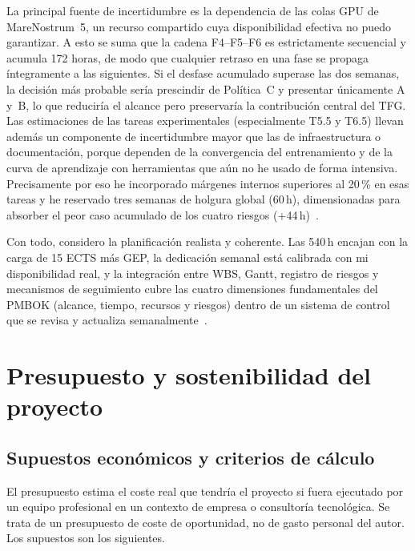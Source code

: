 \documentclass[11pt,a4paper]{article}
\begin{document}
La principal fuente de incertidumbre es la dependencia de las colas GPU de MareNostrum~5, un recurso compartido cuya disponibilidad efectiva no puedo garantizar. A esto se suma que la cadena F4--F5--F6 es estrictamente secuencial y acumula 172 horas, de modo que cualquier retraso en una fase se propaga íntegramente a las siguientes. Si el desfase acumulado superase las dos semanas, la decisión más probable sería prescindir de Política~C y presentar únicamente A y~B, lo que reduciría el alcance pero preservaría la contribución central del TFG. Las estimaciones de las tareas experimentales (especialmente T5.5 y T6.5) llevan además un componente de incertidumbre mayor que las de infraestructura o documentación, porque dependen de la convergencia del entrenamiento y de la curva de aprendizaje con herramientas que aún no he usado de forma intensiva. Precisamente por eso he incorporado márgenes internos superiores al 20\,\% en esas tareas y he reservado tres semanas de holgura global (60\,h), dimensionadas para absorber el peor caso acumulado de los cuatro riesgos (+44\,h)~\cite{pmbok}.

Con todo, considero la planificación realista y coherente. Las 540\,h encajan con la carga de 15 ECTS más GEP, la dedicación semanal está calibrada con mi disponibilidad real, y la integración entre WBS, Gantt, registro de riesgos y mecanismos de seguimiento cubre las cuatro dimensiones fundamentales del PMBOK (alcance, tiempo, recursos y riesgos) dentro de un sistema de control que se revisa y actualiza semanalmente~\cite{gep23,gpi}.

\section{Presupuesto y sostenibilidad del proyecto}

\subsection{Supuestos económicos y criterios de cálculo}

El presupuesto estima el coste real que tendría el proyecto si fuera ejecutado por un equipo profesional en un contexto de empresa o consultoría tecnológica. Se trata de un presupuesto de coste de oportunidad, no de gasto personal del autor. Los supuestos son los siguientes.
\end{document}
